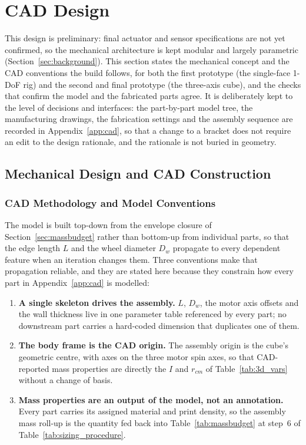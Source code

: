 \section{CAD Design}
\label{sec:cad}

This design is preliminary: final actuator and sensor specifications are not yet
confirmed, so the mechanical architecture is kept modular and largely
parametric (Section~\ref{sec:background}). This section states the mechanical
concept and the CAD conventions the build follows, for both the first
prototype (the single-face 1-DoF rig) and the second and final prototype (the
three-axis cube), and the checks that confirm the model and the fabricated
parts agree. It is deliberately kept to the level of decisions and interfaces:
the part-by-part model tree, the manufacturing drawings, the fabrication
settings and the assembly sequence are recorded in
Appendix~\ref{app:cad}, so that a change to a bracket does not require an
edit to the design rationale, and the rationale is not buried in geometry.

\subsection{Mechanical Design and CAD Construction}
\label{sec:mechanical}

\subsubsection{CAD Methodology and Model Conventions}
\label{sec:cad_method}

The model is built top-down from the envelope closure of
Section~\ref{sec:massbudget} rather than bottom-up from individual parts, so
that the edge length $L$ and the wheel diameter $D_w$ propagate to every
dependent feature when an iteration changes them. Three conventions make that
propagation reliable, and they are stated here because they constrain how every
part in Appendix~\ref{app:cad} is modelled:

\begin{enumerate}
  \item \textbf{A single skeleton drives the assembly.} $L$, $D_w$, the motor
        axis offsets and the wall thickness live in one parameter table
        referenced by every part; no downstream part carries a hard-coded
        dimension that duplicates one of them.
  \item \textbf{The body frame is the CAD origin.} The assembly origin is the
        cube's geometric centre, with axes on the three motor spin axes, so
        that CAD-reported mass properties are directly the $I$ and $r_{cm}$ of
        Table~\ref{tab:3d_vars} without a change of basis.
  \item \textbf{Mass properties are an output of the model, not an annotation.}
        Every part carries its assigned material and print density, so the
        assembly mass roll-up is the quantity fed back into
        Table~\ref{tab:massbudget} at step~6 of
        Table~\ref{tab:sizing_procedure}.
\end{enumerate}

